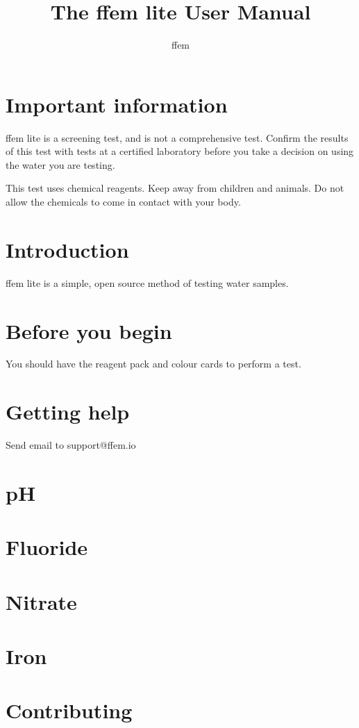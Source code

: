 \documentclass{article}
\title{The ffem lite User Manual}
\author{ffem}
\begin{document}
\maketitle

\section{Important information}
ffem lite is a screening test, and is not a comprehensive test. Confirm the results of this test with tests at a certified laboratory before you take a decision on using the water you are testing.

This test uses chemical reagents. Keep away from children and animals. Do not allow the chemicals to come in contact with your body.

\section{Introduction}
ffem lite is a simple, open source method of testing water samples.

\section{Before you begin}
You should have the reagent pack and colour cards to perform a test.

\section{Getting help}
Send email to support@ffem.io

\section{pH}


\section{Fluoride}

\section{Nitrate}

\section{Iron}

\section{Contributing}
\end{document}

